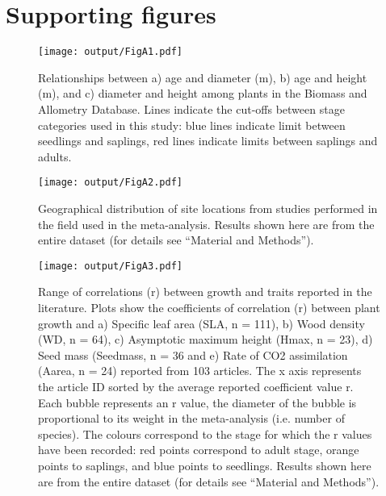 \documentclass[a4paper,11pt]{article}
\begin{document}
\clearpage
\setcounter{secnumdepth}{1}
\begin{appendices}\label{sec:appendices}
\renewcommand{\thefigure}{S\arabic{figure}}
\renewcommand{\thetable}{S\arabic{table}}

\setcounter{figure}{0}
\setcounter{table}{0}


\clearpage

\clearpage
\section{Supporting figures}\label{app:supp_info_figures}

\begin{figure}[h!]
\centering
\texttt{[image: output/FigA1.pdf]}
\caption{Relationships between a) age and diameter (m), b) age and height (m), and c) diameter and height among plants in the Biomass and Allometry Database. Lines indicate the cut-offs between stage categories used in this study: blue lines indicate limit between seedlings and saplings, red lines indicate limits between saplings and adults.}
\label{fig:figA1}
\end{figure}


\begin{figure}[h!]
\centering
\texttt{[image: output/FigA2.pdf]}
\caption{Geographical distribution of site locations from studies performed in the field used in the meta-analysis. Results shown here are from the entire dataset (for details see ``Material and Methods'').}
\label{fig:figA2}
\end{figure}


\begin{figure}[h!]
\centering
\texttt{[image: output/FigA3.pdf]}
\caption{Range of correlations (r) between
growth and traits reported in the literature. Plots show the coefficients of correlation (r)
between plant growth and a) Specific leaf area (SLA, n =
111), b) Wood density (WD, n = 64), c) Asymptotic
maximum height (Hmax, n = 23), d) Seed mass (Seedmass, n = 36 and
e) Rate of CO2 assimilation (Aarea, n = 24) reported from 103
articles. The x axis represents the article ID sorted by the average reported coefficient value r. Each bubble represents an r value, the diameter of the bubble is proportional to its weight in the meta-analysis (i.e. number of species). The colours correspond to the stage for which the r values have been recorded: red points correspond to adult stage, orange points to saplings, and blue points to seedlings. Results shown here are from the entire dataset (for details see ``Material and Methods''). }
\label{fig:figA3}
\end{figure}


\end{appendices}
\end{document}
